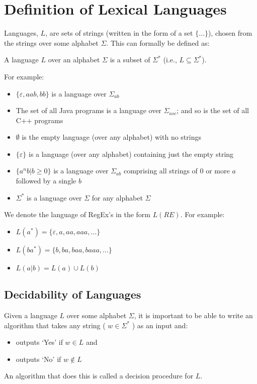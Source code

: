 \section{Definition of Lexical Languages}
Languages, $L$, are sets of strings (written in the form of a set $\{\ldots\}$), chosen from the strings over some alphabet $\Sigma$. This can formally be defined as:
\begin{center}
A language $L$ over an alphabet $\Sigma$ is a subset of $\Sigma^*$ (i.e., $L \subseteq \Sigma^*$).
\end{center}
For example:
\begin{itemize}
    \item $\{\varepsilon, aab, bb\}$ is a language over $\Sigma_{ab}$
    \item The set of all Java programs is a language over $\Sigma_{asc}$; and so is the set of all C++ programs
    \item $\emptyset$ is the empty language (over any alphabet) with no strings
    \item $\{\varepsilon\}$ is a language (over any alphabet) containing just the empty string
    \item $\{a^nb | b \geq0\}$ is a language over $\Sigma_{ab}$ comprising all strings of 0 or more $a$ followed by a single $b$
    \item $\Sigma^*$ is a language over $\Sigma$ for any alphabet $\Sigma$
\end{itemize}

We denote the language of RegEx's in the form $L(RE)$. For example:
\begin{itemize}
    \item $L(a^*) = \{\varepsilon, a, aa, aaa, \ldots \}$
    \item $L(ba^*) = \{b, ba, baa, baaa, \ldots\}$
    \item $L(a|b) = L(a) \cup L(b)$
\end{itemize}

\subsection{Decidability of Languages}
Given a language $L$ over some alphabet $\Sigma$, it is important to be able to write an algorithm that takes any string ( $w \in \Sigma^*$ ) as an input and:
\begin{itemize}
    \item outputs `Yes' if $w \in L$ and
    \item outputs `No' if $w \notin L$
\end{itemize}
An algorithm that does this is called a decision procedure for $L$. 

